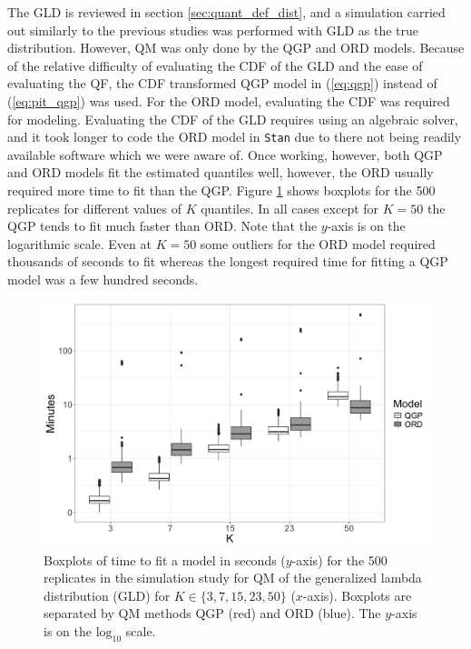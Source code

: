 \documentclass[preprint,12pt,authoryear]{elsarticle}
\begin{document}
The GLD is reviewed in section \ref{sec:quant_def_dist}, and a simulation carried out similarly to the previous studies was performed with GLD as the true distribution. However, QM was only done by the QGP and ORD models. Because of the relative difficulty of evaluating the CDF of the GLD and the ease of evaluating the QF, the CDF transformed QGP model in (\ref{eq:qgp}) instead of (\ref{eq:pit_qgp}) was used. For the ORD model, evaluating the CDF was required for modeling. Evaluating the CDF of the GLD requires using an algebraic solver, and it took longer to code the ORD model in \texttt{Stan} due to there not being readily available software which we were aware of. Once working, however, both QGP and ORD models fit the estimated quantiles well, however, the ORD usually required more time to fit than the QGP. Figure \ref{fig:tuk_time} shows boxplots for the 500 replicates for different values of $K$ quantiles. In all cases except for $K=50$ the QGP tends to fit much faster than ORD. Note that the $y$-axis is on the logarithmic scale. Even at $K=50$ some outliers for the ORD model required thousands of seconds to fit whereas the longest required time for fitting a QGP model was a few hundred seconds.


\begin{figure}[hbt!]
    \centering
    \includegraphics[scale=.32]{Images/tukey_time_log10.png}
    \caption{Boxplots of time to fit a model in seconds ($y$-axis) for the 500 replicates in the simulation study for QM of the generalized lambda distribution (GLD) for $K \in \{3, 7, 15, 23, 50\}$ ($x$-axis). Boxplots are separated by QM methods QGP (red) and ORD (blue). The $y$-axis is on the $\text{log}_{10}$ scale.}
    \label{fig:tuk_time}
\end{figure}
\end{document}
